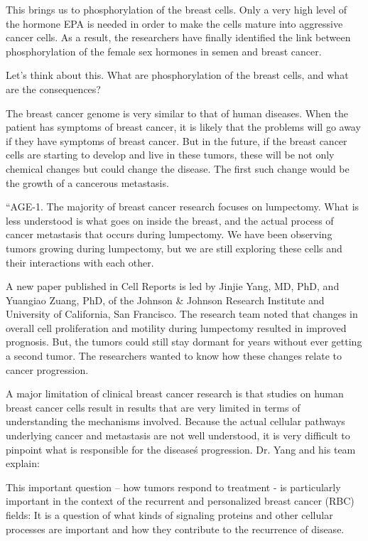 \documentclass{article}
\begin{document}
This brings us to phosphorylation of the breast cells. Only a very high level of the hormone EPA is needed in order to make the cells mature into aggressive cancer cells. As a result, the researchers have finally identified the link between phosphorylation of the female sex hormones in semen and breast cancer.

Let’s think about this. What are phosphorylation of the breast cells, and what are the consequences?

The breast cancer genome is very similar to that of human diseases. When the patient has symptoms of breast cancer, it is likely that the problems will go away if they have symptoms of breast cancer. But in the future, if the breast cancer cells are starting to develop and live in these tumors, these will be not only chemical changes but could change the disease. The first such change would be the growth of a cancerous metastasis.

“AGE-1. The majority of breast cancer research focuses on lumpectomy. What is less understood is what goes on inside the breast, and the actual process of cancer metastasis that occurs during lumpectomy. We have been observing tumors growing during lumpectomy, but we are still exploring these cells and their interactions with each other.

A new paper published in Cell Reports is led by Jinjie Yang, MD, PhD, and Yuangiao Zuang, PhD, of the Johnson \& Johnson Research Institute and University of California, San Francisco. The research team noted that changes in overall cell proliferation and motility during lumpectomy resulted in improved prognosis. But, the tumors could still stay dormant for years without ever getting a second tumor. The researchers wanted to know how these changes relate to cancer progression.

A major limitation of clinical breast cancer research is that studies on human breast cancer cells result in results that are very limited in terms of understanding the mechanisms involved. Because the actual cellular pathways underlying cancer and metastasis are not well understood, it is very difficult to pinpoint what is responsible for the disease\'s progression. Dr. Yang and his team explain:

This important question – how tumors respond to treatment - is particularly important in the context of the recurrent and personalized breast cancer (RBC) fields: It is a question of what kinds of signaling proteins and other cellular processes are important and how they contribute to the recurrence of disease.
\end{document}
